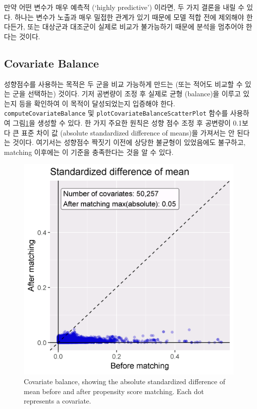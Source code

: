 \documentclass[11pt]{book}
\theoremstyle{definition}
\theoremstyle{definition}
\theoremstyle{definition}
\theoremstyle{remark}
\let\BeginKnitrBlock\begin \let\EndKnitrBlock\end
\begin{document}
\BeginKnitrBlock{rmdimportant}
만약 어떤 변수가 매우 예측적 (`highly predictive') 이라면, 두 가지
결론을 내릴 수 있다. 하나는 변수가 노출과 매우 밀접한 관계가 있기 때문에
모델 적합 전에 제외해야 한다든가, 또는 대상군과 대조군이 실제로 비교가
불가능하기 때문에 분석을 멈추어야 한다는 것이다.
\EndKnitrBlock{rmdimportant}

\subsection{Covariate Balance}\label{covariate-balance}

성향점수를 사용하는 목적은 두 군을 비교 가능하게 만드는 (또는 적어도
비교할 수 있는 군을 선택하는) 것이다. 기저 공변량이 조정 후 실제로 균형
(balance)을 이루고 있는지 등을 확인하여 이 목적이 달성되었는지 입증해야
한다. \texttt{computeCovariateBalance} 및
\texttt{plotCovariateBalanceScatterPlot} 함수를 사용하여
그림\ref{fig:balance}을 생성할 수 있다. 한 가지 주요한 원칙은 성향 점수
조정 후 공변량이 0.1보다 큰 표준 차이 값 (absolute standardized
difference of means)을 가져서는 안 된다는 것이다. 여기서는 성향점수
짝짓기 이전에 상당한 불균형이 있었음에도 불구하고, matching 이후에는 이
기준을 충족한다는 것을 알 수 있다.

\begin{figure}

{\centering \includegraphics[width=0.7\linewidth]{images/PopulationLevelEstimation/balance} 

}

\caption{Covariate balance, showing the absolute standardized difference of mean before and after propensity score matching. Each dot represents a covariate.}\label{fig:balance}
\end{figure}
\end{document}

